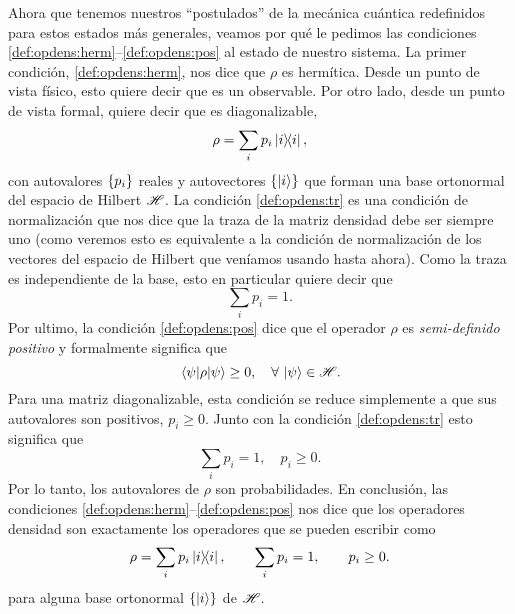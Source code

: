 \documentclass[10pt, a4paper]{article}
\numberwithin{equation}{subsection}
\begin{document}
Ahora que tenemos nuestros ``postulados'' de la mecánica cuántica redefinidos
para estos estados más generales, veamos por qué le pedimos las condiciones
\eqref{def:opdens:herm}--\eqref{def:opdens:pos} al estado de nuestro sistema.
La primer condición, \eqref{def:opdens:herm}, nos dice que $\rho$ es hermítica.
Desde un punto de vista físico, esto quiere decir que es un observable. Por
otro lado, desde un punto de vista formal, quiere decir que es diagonalizable,
\begin{equation}
  \rho = \sum_i p_i \projector{i},
\end{equation}
con autovalores $\set{p_i}$ reales y autovectores $\set{\ket{i}}$ que forman
una base ortonormal del espacio de Hilbert $\mathscr{H}$.
La condición \eqref{def:opdens:tr} es una condición de normalización que nos
dice que la traza de la matriz densidad debe ser siempre uno (como veremos esto
es equivalente a la condición de normalización de los vectores del espacio de
Hilbert que veníamos usando hasta ahora). Como la traza es independiente de la
base, esto en particular quiere decir que
\begin{equation}
  \sum_i p_i = 1.
\end{equation}
Por ultimo, la condición \eqref{def:opdens:pos} dice que el operador $\rho$ es
\emph{semi-definido positivo} y formalmente significa que
\begin{equation}
  \matrixel{\psi}{\rho}{\psi} \geq 0, \quad\forall\,\ket{\psi}\in\Hilbert.
\end{equation}
Para una matriz diagonalizable, esta condición se reduce simplemente a que sus
autovalores son positivos, $p_i \geq 0$. Junto con la condición
\eqref{def:opdens:tr} esto significa que
\begin{equation}
  \sum_i p_i = 1, \quad p_i\geq 0.
\end{equation}
Por lo tanto, los autovalores de $\rho$ son probabilidades. En conclusión, las
condiciones \eqref{def:opdens:herm}--\eqref{def:opdens:pos} nos dice que los
operadores densidad son exactamente los operadores que se pueden escribir como
\begin{equation} \label{def:opdens:spectral}
  \rho = \sum_i p_i\projector{i}, \qquad \sum_i p_i = 1, \qquad p_i \geq 0.
\end{equation}
para alguna base ortonormal $\set{\ket{i}}$ de $\mathscr{H}$.
\end{document}
